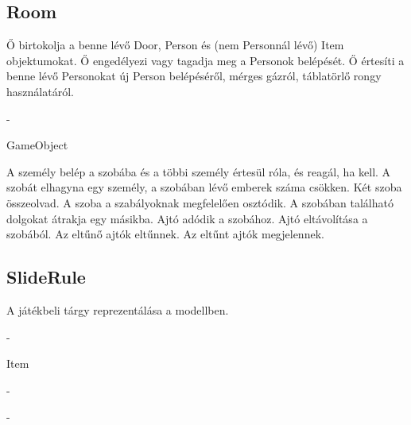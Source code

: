 \subsection{Room}
\begin{class-template-responsibility}
    Ő birtokolja a benne lévő Door, Person és (nem Personnál lévő) Item objektumokat.
    Ő engedélyezi vagy tagadja meg a Personok belépését.
    Ő értesíti a benne lévő Personokat új Person belépéséről, mérges gázról, táblatörlő rongy használatáról. 
\end{class-template-responsibility}
\begin{class-template-interface}
    -
\end{class-template-interface}
\begin{class-template-baseclass}
    GameObject
\end{class-template-baseclass}
\begin{class-template-attribute}
\end{class-template-attribute}
\begin{class-template-method}
     { A személy belép a szobába és a többi személy értesül róla, és reagál, ha kell.}
     { A szobát elhagyna egy személy, a szobában lévő emberek száma csökken.}
     { Két szoba összeolvad.}
     {A szoba a szabályoknak megfelelően osztódik.}
     {A szobában található dolgokat átrakja egy másikba.}
     {Ajtó adódik a szobához.}
     {Ajtó eltávolítása a szobából.}
     {Az eltűnő ajtók eltűnnek.}
     {Az eltűnt ajtók megjelennek.}
\end{class-template-method}

\subsection{SlideRule}
\begin{class-template-responsibility}
    A játékbeli tárgy reprezentálása a modellben.
\end{class-template-responsibility}
\begin{class-template-interface}
    -
\end{class-template-interface}
\begin{class-template-baseclass}
    Item
\end{class-template-baseclass}
\begin{class-template-attribute}
    -
\end{class-template-attribute}
\begin{class-template-method}
    -
\end{class-template-method}

